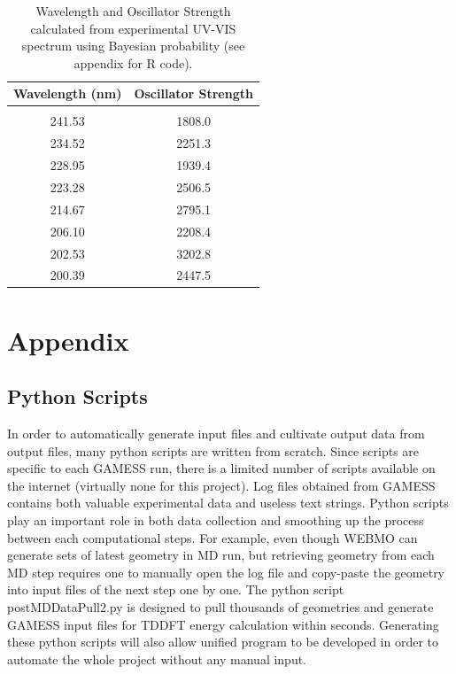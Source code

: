\documentclass[
journal=jpcbfk, %
manuscript=article]{achemso}
\begin{document}
\begin{table}[ht]
	\caption{Wavelength and Oscillator Strength calculated from experimental UV-VIS spectrum using Bayesian probability (see appendix for R code).}
	\label{table:anilineUVTable}
	\centering
	\begin{tabular}{c c}
		Wavelength (nm) & Oscillator Strength\\ [1ex] %
		\hline\hline
		\\[-0.5ex]
		241.53&1808.0\\ 
		234.52&2251.3\\
		228.95&1939.4\\
		223.28&2506.5\\ 
		214.67&2795.1\\
		206.10&2208.4\\
		202.53&3202.8\\
		200.39&2447.5\\[1ex]
	\end{tabular}
\end{table}

\clearpage
\appendix 
\label{appendix}
\section*{Appendix}
\renewcommand{\thesubsection}{\Alph{sub}}
	\subsection{Python Scripts}
	In order to automatically generate input files and cultivate output data from output files, many python scripts are written from scratch. Since scripts are specific to each GAMESS run, there is a limited number of scripts available on the internet (virtually none for this project). Log files obtained from GAMESS contains both valuable experimental data and useless text strings. Python scripts play an important role in both data collection and smoothing up the process between each computational steps.  For example, even though WEBMO can generate sets of latest geometry in MD run, but retrieving geometry from each MD step requires one to manually open the log file and copy-paste the geometry into input files of the next step one by one. The python script postMDDataPull2.py is designed to pull thousands of geometries and generate GAMESS input files for TDDFT energy calculation within seconds. Generating these python scripts will also allow unified program to be developed in order to automate the whole project without any manual input.
\end{document}
